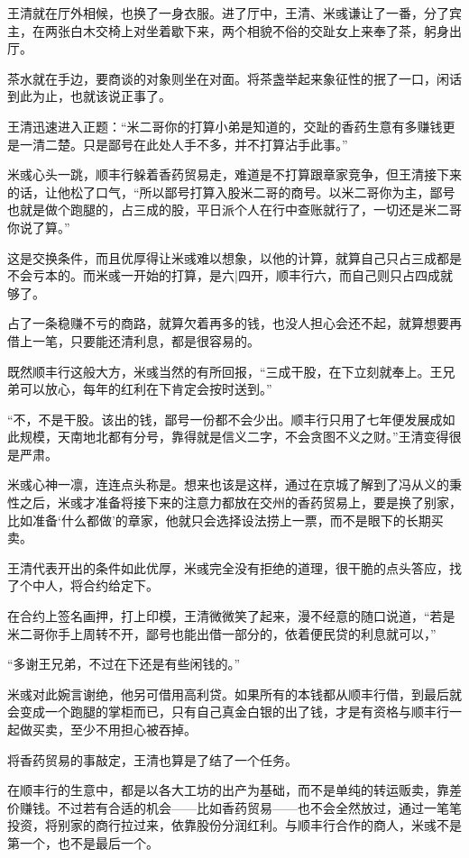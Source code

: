 王清就在厅外相候，也换了一身衣服。进了厅中，王清、米彧谦让了一番，分了宾主，在两张白木交椅上对坐着歇下来，两个相貌不俗的交趾女上来奉了茶，躬身出厅。

茶水就在手边，要商谈的对象则坐在对面。将茶盏举起来象征性的抿了一口，闲话到此为止，也就该说正事了。

王清迅速进入正题：“米二哥你的打算小弟是知道的，交趾的香药生意有多赚钱更是一清二楚。只是鄙号在此处人手不多，并不打算沾手此事。”

米彧心头一跳，顺丰行躲着香药贸易走，难道是不打算跟章家竞争，但王清接下来的话，让他松了口气，“所以鄙号打算入股米二哥的商号。以米二哥你为主，鄙号也就是做个跑腿的，占三成的股，平日派个人在行中查账就行了，一切还是米二哥你说了算。”

这是交换条件，而且优厚得让米彧难以想象，以他的计算，就算自己只占三成都是不会亏本的。而米彧一开始的打算，是六|四开，顺丰行六，而自己则只占四成就够了。

占了一条稳赚不亏的商路，就算欠着再多的钱，也没人担心会还不起，就算想要再借上一笔，只要能还清利息，都是很容易的。

既然顺丰行这般大方，米彧当然的有所回报，“三成干股，在下立刻就奉上。王兄弟可以放心，每年的红利在下肯定会按时送到。”

“不，不是干股。该出的钱，鄙号一份都不会少出。顺丰行只用了七年便发展成如此规模，天南地北都有分号，靠得就是信义二字，不会贪图不义之财。”王清变得很是严肃。

米彧心神一凛，连连点头称是。想来也该是这样，通过在京城了解到了冯从义的秉性之后，米彧才准备将接下来的注意力都放在交州的香药贸易上，要是换了别家，比如准备‘什么都做’的章家，他就只会选择设法捞上一票，而不是眼下的长期买卖。

王清代表开出的条件如此优厚，米彧完全没有拒绝的道理，很干脆的点头答应，找了个中人，将合约给定下。

在合约上签名画押，打上印模，王清微微笑了起来，漫不经意的随口说道，“若是米二哥你手上周转不开，鄙号也能出借一部分的，依着便民贷的利息就可以，”

“多谢王兄弟，不过在下还是有些闲钱的。”

米彧对此婉言谢绝，他另可借用高利贷。如果所有的本钱都从顺丰行借，到最后就会变成一个跑腿的掌柜而已，只有自己真金白银的出了钱，才是有资格与顺丰行一起做买卖，至少不用担心被吞掉。

将香药贸易的事敲定，王清也算是了结了一个任务。

在顺丰行的生意中，都是以各大工坊的出产为基础，而不是单纯的转运贩卖，靠差价赚钱。不过若有合适的机会——比如香药贸易——也不会全然放过，通过一笔笔投资，将别家的商行拉过来，依靠股份分润红利。与顺丰行合作的商人，米彧不是第一个，也不是最后一个。

